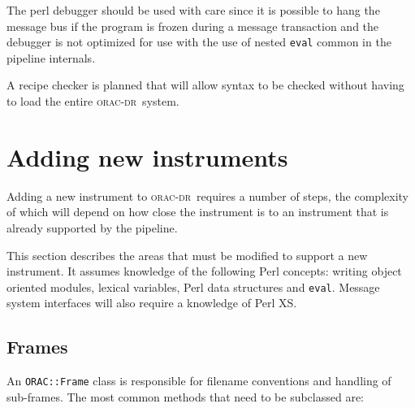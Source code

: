 \documentclass[twoside,11pt]{article}
\renewcommand{\_}{\texttt{\symbol{95}}}
\newcommand{\Oracdr}{\textsc{orac-dr}}
\begin{document}
The perl debugger should be used with care since it is possible to
hang the message bus if the program is frozen during a message
transaction and the debugger is not optimized for use with the use of nested
\texttt{eval} common in the pipeline internals.

A recipe checker is planned that will allow syntax to be checked
without having to load the entire \Oracdr\ system.

\section{Adding new instruments}

Adding a new instrument to \Oracdr\ requires a number of steps, the
complexity of which will depend on how close the instrument is to an
instrument that is already supported by the pipeline.

This section describes the areas that must be modified to support a
new instrument. It assumes knowledge of the following Perl concepts:
writing object oriented modules, lexical variables, Perl data
structures and \texttt{eval}. Message system interfaces will also
require a knowledge of Perl XS.


\subsection{Frames}

An \texttt{ORAC::Frame} class is responsible for filename conventions
and handling of sub-frames. The most common methods that need to be
subclassed are:
\end{document}
